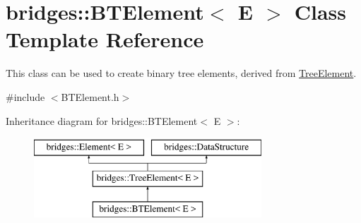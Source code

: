 \hypertarget{classbridges_1_1_b_t_element}{}\section{bridges\+:\+:B\+T\+Element$<$ E $>$ Class Template Reference}
\label{classbridges_1_1_b_t_element}


This class can be used to create binary tree elements, derived from \hyperlink{classbridges_1_1_tree_element}{Tree\+Element}.  




{\ttfamily \#include $<$B\+T\+Element.\+h$>$}

Inheritance diagram for bridges\+:\+:B\+T\+Element$<$ E $>$\+:\begin{figure}[H]
\begin{center}
\leavevmode
\includegraphics[height=3.000000cm]{classbridges_1_1_b_t_element}
\end{center}
\end{figure}
